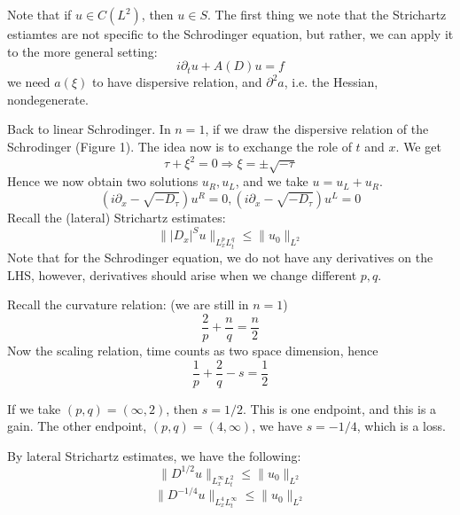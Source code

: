 Note that if $u\in C(L^2)$, then $u\in S$. The first thing we note that the Strichartz estiamtes are not specific to the Schrodinger equation, but rather, we can apply it to the more general setting:
\begin{equation*}
    i\partial_t u+A(D)u=f
\end{equation*}
we need $a(\xi)$ to have dispersive relation, and $\partial^2a$, i.e. the Hessian, nondegenerate.

Back to linear Schrodinger. In $n=1$, if we draw the dispersive relation of the Schrodinger (Figure 1). The idea now is to exchange the role of $t$ and $x$. We get 
\begin{equation*}
    \tau+\xi^2=0\Rightarrow \xi=\pm\sqrt{-\tau}
\end{equation*}
Hence we now obtain two solutions $u_R, u_L$, and we take $u=u_L+u_R$.
\begin{equation*}
    (i\partial_x-\sqrt{-D_\tau})u^R=0, (i\partial_x-\sqrt{-D_\tau})u^L=0
\end{equation*}
Recall the (lateral) Strichartz estimates:
\begin{equation*}
    \||D_x|^Su\|_{L_x^pL_t^q}\leq\|u_0\|_{L^2}
\end{equation*}
Note that for the Schrodinger equation, we do not have any derivatives on the LHS, however, derivatives should arise when we change different $p,q$. 

Recall the curvature relation: (we are still in $n=1$)
\begin{equation*}
    \frac{2}{p}+\frac{n}{q}=\frac{n}{2}
\end{equation*}
Now the scaling relation, time counts as two space dimension, hence
\begin{equation*}
    \frac{1}{p}+\frac{2}{q}-s=\frac{1}{2}
\end{equation*}

If we take $(p,q)=(\infty,2)$, then $s=1/2$. This is one endpoint, and this is a gain. The other endpoint, $(p,q)=(4,\infty)$, we have $s=-1/4$, which is a loss.

\begin{proposition}
    By lateral Strichartz estimates, we have the following:
    \begin{equation*}
        \|D^{1/2}u\|_{L_x^\infty L_t^2}\leq\|u_0\|_{L^2}
    \end{equation*}
    \begin{equation*}
        \|D^{-1/4}u\|_{L_x^4 L_t^\infty}\leq\|u_0\|_{L^2}
    \end{equation*}
\end{proposition}


